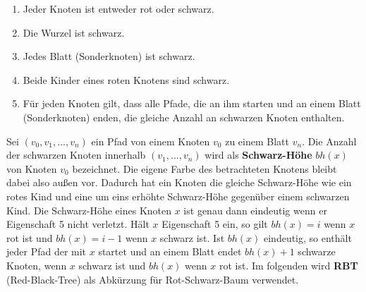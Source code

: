 \documentclass[a4paper,12pt]{article}
\begin{document}
\begin{enumerate}
	\item Jeder Knoten ist entweder rot oder schwarz.
	\item Die Wurzel ist schwarz.
	\item Jedes Blatt (Sonderknoten) ist schwarz.
	\item Beide Kinder eines roten Knotens sind schwarz.
	\item Für jeden Knoten gilt, dass alle Pfade, die an ihm starten und an einem Blatt (Sonderknoten) enden, die gleiche Anzahl an schwarzen Knoten enthalten. 
\end{enumerate}  
Sei $(v_0,v_1,...,v_n)$ ein Pfad von einem Knoten $v_0$ zu einem Blatt $v_n$. Die Anzahl der schwarzen Knoten innerhalb $(v_1,...,v_n)$ wird als \textbf{Schwarz-Höhe} $\mathit{bh(x)}$ von Knoten $v_0$ bezeichnet. Die eigene Farbe des betrachteten Knotens bleibt dabei also außen vor. Dadurch hat ein Knoten die gleiche Schwarz-Höhe wie ein rotes Kind und eine um eins erhöhte Schwarz-Höhe gegenüber einem schwarzen Kind. Die Schwarz-Höhe eines Knoten $x$ ist genau dann eindeutig wenn er Eigenschaft 5 nicht verletzt. Hält $x$ Eigenschaft 5 ein, so gilt $\mathit{bh(x)} = i$ wenn $x$ rot ist und $\mathit{bh(x)} = i - 1$ wenn $x$ schwarz ist. Ist $\mathit{bh(x)}$ eindeutig, so enthält jeder Pfad der mit $x$ startet und an einem Blatt endet $\mathit{bh(x)} + 1$ schwarze Knoten, wenn $x$ schwarz ist und  $\mathit{bh(x)}$ wenn $x$ rot ist. Im folgenden wird \textbf{RBT} (Red-Black-Tree) als Abkürzung für Rot-Schwarz-Baum verwendet.  \\
\end{document}
